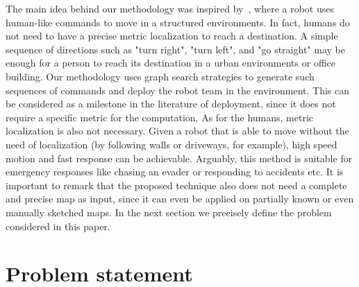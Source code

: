 \documentclass[twocolumn]{svjour3}       %
\begin{document}
%
The main idea behind our methodology was inspired by~\cite{Arthur2015}, where a robot uses human-like commands to move in a structured environments. In fact, humans do not need to have a precise metric localization to reach a destination. A simple sequence of directions such as "turn right", "turn left", and "go straight" may be enough for a person to reach its destination in a urban environments or office building. Our methodology uses graph search strategies to generate such sequences of commands and deploy the robot team in the environment. 
%
This can be considered as a milestone in the literature of deployment, since it does not require a specific metric for the computation. As for the humans, metric localization is also not necessary. Given a robot that is able to move without the need of localization (by following walls or driveways, for example), high speed motion and fast response can be achievable. Arguably, this method is suitable for emergency responses like chasing an evader or responding to accidents etc. It is important to remark that the proposed technique also does not need a complete and precise map as input, since it can even be applied on partially known or even manually sketched maps. %
In the next section we precisely define the problem considered in this paper.  

%
\section{Problem statement}
\label{sec:probstate}
\end{document}
